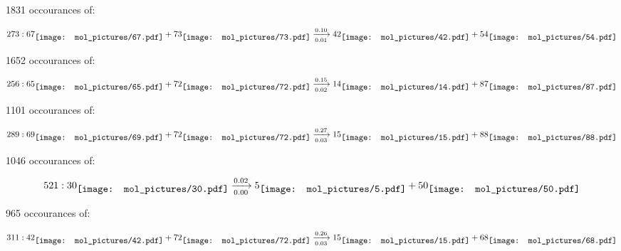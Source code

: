 \documentclass{article}
\begin{document}
1831 occourances of:

$$
273:  
67
\raisebox{-.5\height}{\texttt{[image: mol\_pictures/67.pdf]}}
+
73
\raisebox{-.5\height}{\texttt{[image: mol\_pictures/73.pdf]}}
\xrightarrow[0.01]{0.10}
42
\raisebox{-.5\height}{\texttt{[image: mol\_pictures/42.pdf]}}
+
54
\raisebox{-.5\height}{\texttt{[image: mol\_pictures/54.pdf]}}
$$



\vspace{1cm}


1652 occourances of:

$$
256:  
65
\raisebox{-.5\height}{\texttt{[image: mol\_pictures/65.pdf]}}
+
72
\raisebox{-.5\height}{\texttt{[image: mol\_pictures/72.pdf]}}
\xrightarrow[0.02]{0.15}
14
\raisebox{-.5\height}{\texttt{[image: mol\_pictures/14.pdf]}}
+
87
\raisebox{-.5\height}{\texttt{[image: mol\_pictures/87.pdf]}}
$$



\vspace{1cm}


1101 occourances of:

$$
289:  
69
\raisebox{-.5\height}{\texttt{[image: mol\_pictures/69.pdf]}}
+
72
\raisebox{-.5\height}{\texttt{[image: mol\_pictures/72.pdf]}}
\xrightarrow[0.03]{0.27}
15
\raisebox{-.5\height}{\texttt{[image: mol\_pictures/15.pdf]}}
+
88
\raisebox{-.5\height}{\texttt{[image: mol\_pictures/88.pdf]}}
$$



\vspace{1cm}


1046 occourances of:

$$
521:  
30
\raisebox{-.5\height}{\texttt{[image: mol\_pictures/30.pdf]}}
\xrightarrow[0.00]{0.02}
5
\raisebox{-.5\height}{\texttt{[image: mol\_pictures/5.pdf]}}
+
50
\raisebox{-.5\height}{\texttt{[image: mol\_pictures/50.pdf]}}
$$



\vspace{1cm}


965 occourances of:

$$
311:  
42
\raisebox{-.5\height}{\texttt{[image: mol\_pictures/42.pdf]}}
+
72
\raisebox{-.5\height}{\texttt{[image: mol\_pictures/72.pdf]}}
\xrightarrow[0.03]{0.26}
15
\raisebox{-.5\height}{\texttt{[image: mol\_pictures/15.pdf]}}
+
68
\raisebox{-.5\height}{\texttt{[image: mol\_pictures/68.pdf]}}
$$
\end{document}

